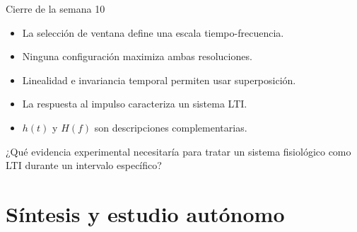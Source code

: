 \documentclass[
  ignorenonframetext,
  aspectratio=169,
  spanish,
]{beamer}
\providecommand{\tightlist}{%
  \setlength{\itemsep}{0pt}\setlength{\parskip}{0pt}}
\begin{document}
\begin{frame}{Cierre de la semana 10}
  \protect{}\label{cierre-de-la-semana-10}
  \begin{itemize}
    \tightlist
    \item
          La selección de ventana define una escala tiempo-frecuencia.
    \item
          Ninguna configuración maximiza ambas resoluciones.
    \item
          Linealidad e invariancia temporal permiten usar superposición.
    \item
          La respuesta al impulso caracteriza un sistema LTI.
    \item
          \(h(t)\) y \(H(f)\) son descripciones complementarias.
  \end{itemize}

  \begin{tcolorbox}[enhanced jigsaw, arc=.35mm, bottomrule=.15mm, bottomtitle=1mm, breakable, colback=white, colbacktitle=quarto-callout-note-color!10!white, colframe=quarto-callout-note-color-frame, coltitle=black, left=2mm, leftrule=.75mm, opacityback=0, opacitybacktitle=0.6, rightrule=.15mm, title=\textcolor{quarto-callout-note-color}{\faInfo}\hspace{0.5em}{Pregunta de salida}, titlerule=0mm, toprule=.15mm, toptitle=1mm]

    ¿Qué evidencia experimental necesitaría para tratar un sistema
    fisiológico como LTI durante un intervalo específico?

  \end{tcolorbox}
\end{frame}

\section{Síntesis y estudio
  autónomo}\label{suxedntesis-y-estudio-autuxf3nomo}
\end{document}
